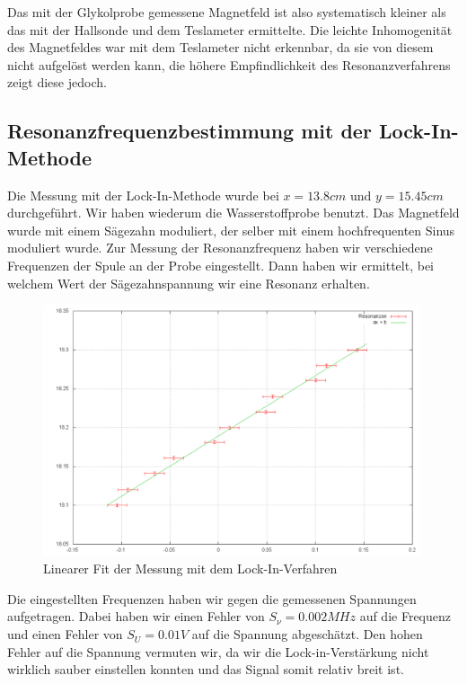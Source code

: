 Das mit der Glykolprobe gemessene Magnetfeld ist also systematisch kleiner als das mit der Hallsonde und dem Teslameter ermittelte. Die leichte Inhomogenität des Magnetfeldes war mit dem Teslameter nicht erkennbar, da sie von diesem nicht aufgelöst werden kann, die höhere Empfindlichkeit des Resonanzverfahrens zeigt diese jedoch.

\subsection{Resonanzfrequenzbestimmung mit der Lock-In-Methode}

Die Messung mit der Lock-In-Methode wurde bei $x=13.8cm$ und $y=15.45cm$ durchgeführt. Wir haben wiederum die Wasserstoffprobe benutzt. Das Magnetfeld wurde mit einem Sägezahn moduliert, der selber mit einem hochfrequenten Sinus moduliert wurde. Zur Messung der Resonanzfrequenz haben wir verschiedene Frequenzen der Spule an der Probe eingestellt. Dann haben wir ermittelt, bei welchem Wert der Sägezahnspannung wir eine Resonanz erhalten.

\begin{figure}[H]
\centering \includegraphics[width=0.99\textwidth]{Bilder/lockin.png}
\caption{Linearer Fit der Messung mit dem Lock-In-Verfahren}
\end{figure}

Die eingestellten Frequenzen haben wir gegen die gemessenen Spannungen aufgetragen. Dabei haben wir einen Fehler von $S_\nu = 0.002 MHz$ auf die Frequenz und einen Fehler von $S_U = 0.01 V$ auf die Spannung abgeschätzt. Den hohen Fehler auf die Spannung vermuten wir, da wir die Lock-in-Verstärkung nicht wirklich sauber einstellen konnten und das Signal somit relativ breit ist.

